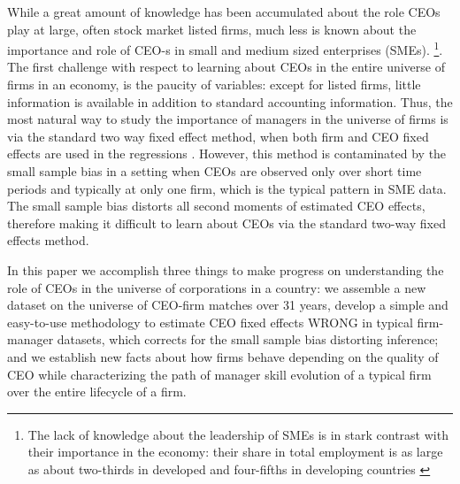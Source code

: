 \documentclass[11pt,a4paper]{article}
\begin{document}
While a great amount of knowledge has been accumulated about the role CEOs play at large, often stock market listed firms, much less is known about the importance and role of CEO-s in small and medium sized enterprises (SMEs). \footnote{The lack of knowledge about the leadership of SMEs is in stark contrast with their importance in the economy: their share in total employment is as large as about two-thirds in developed and four-fifths in developing countries \citep{MadgavkarEtAl2024_MSMEs}}. The first challenge with respect to learning about CEOs in the entire universe of firms in an economy, is the paucity of variables: except for listed firms, little information is available in addition to standard accounting information. Thus, the most natural way to study the importance of managers in the universe of firms is via the standard two way fixed effect method, when both firm and CEO fixed effects are used in the regressions \citep{Bertrand2003-io}. However, this method is contaminated by the small sample bias in a setting when CEOs are observed only over short time periods and typically at only one firm, which is the typical pattern in SME data. The small sample bias distorts all second moments of estimated CEO effects, therefore making it difficult to learn about CEOs via the standard two-way fixed effects method.


In this paper we accomplish three things to make progress on understanding the role of CEOs in the universe of corporations in a country: we assemble a new dataset on the universe of CEO-firm matches over 31 years, develop a simple and easy-to-use methodology to estimate CEO fixed effects WRONG in typical firm-manager datasets, which corrects for the small sample bias distorting inference; and we establish new facts about how firms behave depending on the quality of CEO while characterizing the path of manager skill evolution of a typical firm over the entire lifecycle of a firm.
\end{document}

